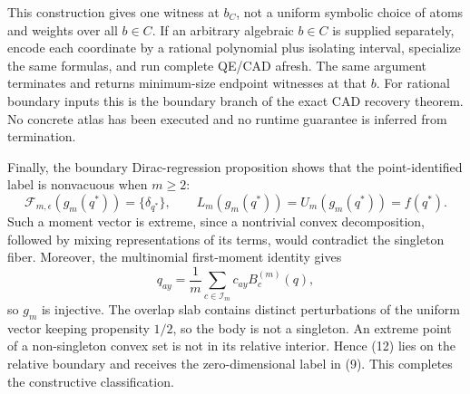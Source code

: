 This construction gives one witness at \(b_C\), not a uniform symbolic choice of atoms and weights over all \(b\in C\).  If an arbitrary algebraic \(b\in C\) is supplied separately, encode each coordinate by a rational polynomial plus isolating interval, specialize the same formulas, and run complete QE/CAD afresh.  The same argument terminates and returns minimum-size endpoint witnesses at that \(b\).  For rational boundary inputs this is the boundary branch of the exact CAD recovery theorem.  No concrete atlas has been executed and no runtime guarantee is inferred from termination.

Finally, the boundary Dirac-regression proposition shows that the point-identified label is nonvacuous when \(m\geq2\):
\[
 \mathcal F_{m,\epsilon}(g_m(q^*))=\{\delta_{q^*}\},
 \qquad L_m(g_m(q^*))=U_m(g_m(q^*))=f(q^*).
\tag{12}
\]
Such a moment vector is extreme, since a nontrivial convex decomposition, followed by mixing representations of its terms, would contradict the singleton fiber.  Moreover, the multinomial first-moment identity gives
\[
 q_{ay}=\frac1m\sum_{c\in\mathcal I_m}c_{ay}B_c^{(m)}(q),
\tag{13}
\]
so \(g_m\) is injective.  The overlap slab contains distinct perturbations of the uniform vector keeping propensity \(1/2\), so the body is not a singleton.  An extreme point of a non-singleton convex set is not in its relative interior.  Hence (12) lies on the relative boundary and receives the zero-dimensional label in (9).  This completes the constructive classification.